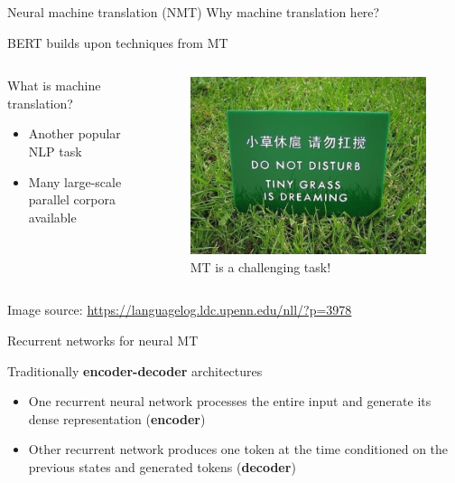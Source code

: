 \documentclass[12pt,aspectratio=169,handout]{beamer}
\begin{document}
\begin{frame}{Neural machine translation (NMT)}
	Why machine translation here?
	
	BERT builds upon techniques from MT
	
	\begin{columns}
		\begin{column}{0.5\textwidth}
			What is machine translation?
			
			\begin{itemize}
				\item Another popular NLP task
				\item Many large-scale parallel corpora available
			\end{itemize}
			
			
		\end{column}
		\begin{column}{0.4\textwidth}
			\begin{figure}
				\includegraphics[width=\linewidth]{img/nmt.jpg}
				\caption{MT is a challenging task!}
			\end{figure}	
			
		\end{column}
	\end{columns}
	
	\begin{scriptsize}
		Image source: \url{https://languagelog.ldc.upenn.edu/nll/?p=3978}
	\end{scriptsize}
\end{frame}

\begin{frame}{Recurrent networks for neural MT}
	
	Traditionally \textbf{encoder-decoder} architectures	
	
	\begin{itemize}
		\item One recurrent neural network processes the entire input and generate its dense representation (\textbf{encoder})
		\item Other recurrent network produces one token at the time conditioned on the previous states and generated tokens (\textbf{decoder})
	\end{itemize}
\end{frame}
\end{document}
